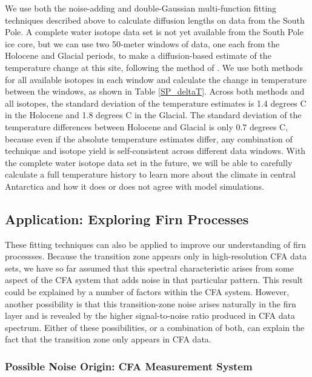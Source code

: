 \documentclass[draft, jgrga]{AGUTeX}
\begin{document}
\begin{article}
We use both the noise-adding and double-Gaussian multi-function fitting techniques described above to calculate diffusion lengths on data from the South Pole. A complete water isotope data set is not yet available from the South Pole ice core, but we can use two 50-meter windows of data, one each from the Holocene and Glacial periods, to make a diffusion-based estimate of the temperature change at this site, following the method of \citet{Gkinis2014}. We use both methods for all available isotopes in each window and calculate the change in temperature between the windows, as shown in Table \ref{SP_deltaT}. Across both methods and all isotopes, the standard deviation of the temperature estimates is 1.4 degrees C in the Holocene and 1.8 degrees C in the Glacial. The standard deviation of the temperature differences between Holocene and Glacial is only 0.7 degrees C, because even if the absolute temperature estimates differ, any combination of technique and isotope yield is self-consistent across different data windows. With the complete water isotope data set in the future, we will be able to carefully calculate a full temperature history to learn more about the climate in central Antarctica and how it does or does not agree with model simulations.


\subsection{Application: Exploring Firn Processes}

These fitting techniques can also be applied to improve our understanding of firn processses. Because the transition zone appears only in high-resolution CFA data sets, we have so far assumed that this spectral characteristic arises from some aspect of the CFA system that adds noise in that particular pattern. This result could be explained by a number of factors within the CFA system. However, another possibility is that this transition-zone noise arises naturally in the firn layer and is revealed by the higher signal-to-noise ratio produced in CFA data spectrum. Either of these possibilities, or a combination of both, can explain the fact that the transition zone only appears in CFA data.

\subsubsection{Possible Noise Origin: CFA Measurement System}


\end{article}
\end{document}
